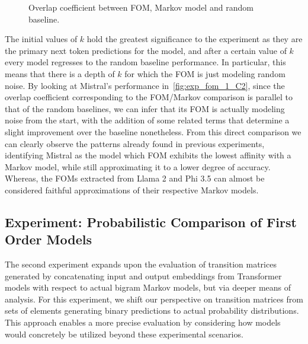 \begin{figure}[t!]
    \centering
    \caption{Overlap coefficient between FOM, Markov model and random baseline.}
    \label{fig:exp_fom_1_C}
\end{figure}

The initial values of $k$ hold the greatest significance to the experiment as they are the primary next token predictions for the model, and after a certain value of $k$ every model regresses to the random baseline performance.
In particular, this means that there is a depth of $k$ for which the FOM is just modeling random noise.
By looking at Mistral's performance in~\cref{fig:exp_fom_1_C2}, since the overlap coefficient corresponding to the FOM/Markov comparison is parallel to that of the random baselines, we can infer that its FOM is actually modeling noise from the start, with the addition of some related terms that determine a slight improvement over the baseline nonetheless.
From this direct comparison we can clearly observe the patterns already found in previous experiments, identifying Mistral as the model which FOM exhibits the lowest affinity with a Markov model, while still approximating it to a lower degree of accuracy.
Whereas, the FOMs extracted from Llama 2 and Phi 3.5 can almost be considered faithful approximations of their respective Markov models.

\subsection{Experiment: Probabilistic Comparison of First Order Models}\label{ssec:exp_fom_exp2}

The second experiment expands upon the evaluation of transition matrices generated by concatenating input and output embeddings from Transformer models with respect to actual bigram Markov models, but via deeper means of analysis.
For this experiment, we shift our perspective on transition matrices from sets of elements generating binary predictions to actual probability distributions.
This approach enables a more precise evaluation by considering how models would concretely be utilized beyond these experimental scenarios.

